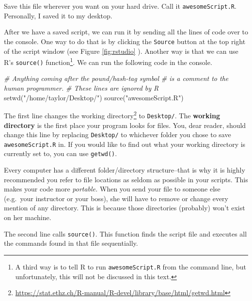 \documentclass[
  12pt,
  krantz2]{krantz}
\makeatletter
\newenvironment{Shaded}{\begin{snugshade}}{\end{snugshade}}
\newcommand{\CommentTok}[1]{\textcolor[rgb]{0.37,0.37,0.37}{\textit{#1}}}
\newcommand{\FunctionTok}[1]{\textcolor[rgb]{0,0,0}{#1}}
\newcommand{\NormalTok}[1]{#1}
\newcommand{\StringTok}[1]{\textcolor[rgb]{0.5,0.5,0.5}{#1}}
\renewcommand{\href}[2]{#2\footnote{\url{#1}}}
\newenvironment{kframe}{%
\medskip{}
\setlength{\fboxsep}{.8em}
 \def\at@end@of@kframe{}%
 \ifinner\ifhmode%
  \def\at@end@of@kframe{\end{minipage}}%
  \begin{minipage}{\columnwidth}%
 \fi\fi%
 \def\FrameCommand##1{\hskip\@totalleftmargin \hskip-\fboxsep
 \colorbox{shadecolor}{##1}\hskip-\fboxsep
     \hskip-\linewidth \hskip-\@totalleftmargin \hskip\columnwidth}%
 \MakeFramed {\advance\hsize-\width
   \@totalleftmargin\z@ \linewidth\hsize
   \@setminipage}}%
 {\par\unskip\endMakeFramed%
 \at@end@of@kframe}
\renewenvironment{Shaded}{\begin{kframe}}{\end{kframe}}
\makeatother
\begin{document}
Save this file wherever you want on your hard drive. Call it \texttt{awesomeScript.R}. Personally, I saved it to my desktop.

After we have a saved script, we can run it by sending all the lines of code over to the console. One way to do that is by clicking the \texttt{Source} button at the top right of the script window (see Figure \ref{fig:rstudio} ). Another way is that we can use R's \texttt{source()} function\footnote{A third way is to tell R to run \texttt{awesomeScript.R} from the command line, but unfortunately, this will not be discussed in this text.}. We can run the following code in the console.

\begin{Shaded}
\begin{Highlighting}[]
\CommentTok{\# Anything coming after the pound/hash{-}tag symbol}
\CommentTok{\# is a comment to the human programmer.}
\CommentTok{\# These lines are ignored by R}
\FunctionTok{setwd}\NormalTok{(}\StringTok{"/home/taylor/Desktop/"}\NormalTok{)}
\FunctionTok{source}\NormalTok{(}\StringTok{"awesomeScript.R"}\NormalTok{)}
\end{Highlighting}
\end{Shaded}

The first line changes the \href{https://stat.ethz.ch/R-manual/R-devel/library/base/html/getwd.html}{working directory} to \texttt{Desktop/}. The \textbf{working directory} is the first place your program looks for files. You, dear reader, should change this line by replacing \texttt{Desktop/} to whichever folder you chose to save \texttt{awesomeScript.R} in. If you would like to find out what your working directory is currently set to, you can use \texttt{getwd()}.

\begin{rmd-details}
Every computer has a different folder/directory structure--that is why it is highly recommended you refer to file locations as seldom as possible in your scripts. This makes your code more \emph{portable.} When you send your file to someone else (e.g.~your instructor or your boss), she will have to remove or change every mention of any directory. This is because those directories (probably) won't exist on her machine.

\end{rmd-details}

The second line calls \texttt{source()}. This function finds the script file and executes all the commands found in that file sequentially.
\end{document}
